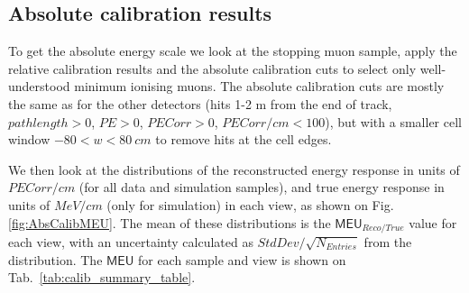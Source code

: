 \subsection{Absolute calibration results}
To get the absolute energy scale we look at the stopping muon sample, apply the relative calibration results and the absolute calibration cuts to select only well-understood minimum ionising muons. The absolute calibration cuts are mostly the same as for the other detectors (hits 1-2 m from the end of track, $\unit{pathlength}>0$, $\unit{PE}>0$, $\unit{PECorr} > 0$, $\unit{PECorr/cm} < 100$), but with a smaller cell window $-80<w<80\ \unit{cm}$ to remove hits at the cell edges.

We then look at the distributions of the reconstructed energy response in units of $\unit{PECorr/cm}$ (for all data and simulation samples), and true energy response in units of $\unit{MeV/cm}$ (only for simulation) in each view, as shown on Fig. \ref{fig:AbsCalibMEU}. The mean of these distributions is the $\textsf{MEU}_{Reco/True}$ value for each view, with an uncertainty calculated as $StdDev/\sqrt{N_{Entries}}$ from the distribution. The $\textsf{MEU}$ for each sample and view is shown on Tab.~\ref{tab:calib_summary_table}.

